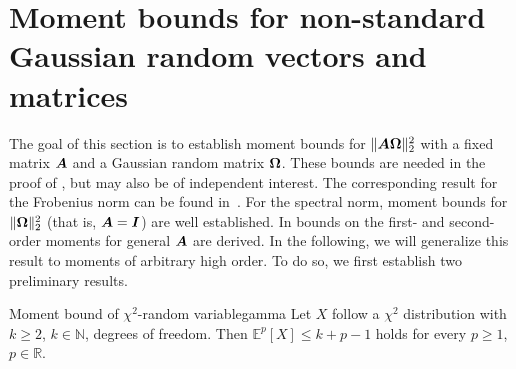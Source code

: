 \appendix

\color{blue}
\section{Moment bounds for non-standard Gaussian random vectors and matrices}

The goal of this section is to establish moment bounds for $\lVert \boldsymbol{A} \boldsymbol{\Omega} \rVert _2^2$ with a fixed matrix $\boldsymbol{A}$ and a Gaussian random matrix $\boldsymbol{\Omega}$. These bounds are needed in the proof of , but may also be of independent interest.
The corresponding result for the Frobenius norm can be found in~\cite[Lemma 7]{kressner-2023-randomized-lowrank}. For the spectral norm, moment bounds for $\lVert \boldsymbol{\Omega} \rVert _2^2$ (that is, $\boldsymbol{A} = \boldsymbol{I}$) are well established\cite{chen-2005-condition-numbers, edelman-1988-eigenvalues-condition, james-1964-distributions-matrix}. In \cite[Lemma B.1]{tropp-2023-randomized-algorithms} bounds on the first- and second-order moments for general $\boldsymbol{A}$ are derived. In the following, we will generalize this result to moments of arbitrary high order. To do so, we first establish two preliminary results.

\begin{lemma}{Moment bound of $\chi^2$-random variable}{gamma}
    Let $X$ follow a $\chi^2$ distribution with $k \ge 2$, $k\in \mathbb{N}$, degrees of freedom. Then 
    $
        \mathbb{E}^{{p}}[X] \leq k + p-1
    $ holds for every $p \ge 1$, $p\in \mathbb R$.
\end{lemma}

